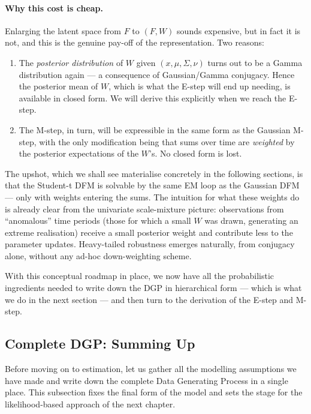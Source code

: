 \documentclass[11pt, a4paper, oneside]{article}
\begin{document}
\paragraph{Why this cost is cheap.}
Enlarging the latent space from $F$ to $(F, W)$ sounds expensive, but in
fact it is not, and this is the genuine pay-off of the representation.
Two reasons:
\begin{enumerate}[leftmargin=1.5em, itemsep=3pt]
    \item The \emph{posterior distribution} of $W$ given $(x, \mu, \Sigma, \nu)$
          turns out to be a Gamma distribution again — a consequence of
          Gaussian/Gamma conjugacy. Hence the posterior mean of $W$,
          which is what the E-step will end up needing, is available in
          closed form. We will derive this explicitly when we reach the
          E-step.
    \item The M-step, in turn, will be expressible in the same form as
          the Gaussian M-step, with the only modification being that
          sums over time are \emph{weighted} by the posterior
          expectations of the $W$'s. No closed form is lost.
\end{enumerate}
The upshot, which we shall see materialise concretely in the following
sections, is that the Student-t DFM is solvable by the same EM loop as
the Gaussian DFM — only with weights entering the sums. The intuition
for what these weights do is already clear from the univariate scale-mixture
picture: observations from ``anomalous'' time periods (those for which a
small $W$ was drawn, generating an extreme realisation) receive a small
posterior weight and contribute less to the parameter updates.
Heavy-tailed robustness emerges naturally, from conjugacy alone, without
any ad-hoc down-weighting scheme.

With this conceptual roadmap in place, we now have all the probabilistic
ingredients needed to write down the DGP in hierarchical form — which is
what we do in the next section — and then turn to the derivation of the
E-step and M-step.

\newpage

\subsection{Complete DGP: Summing Up}

Before moving on to estimation, let us gather all the modelling assumptions
we have made and write down the complete Data Generating Process in a
single place. This subsection fixes the final form of the model and sets the stage for the likelihood-based
approach of the next chapter.
\end{document}

